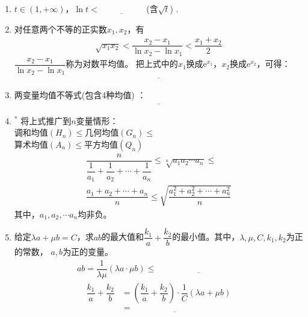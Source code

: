 \documentclass{article}
\newif\ifte
\newcommand{\e}{\mathrm{e}}
\renewcommand\leq\leqslant
\begin{document}
\begin{multicols}{2}
\begin{enumerate}[leftmargin=20pt]
\item $ t\in(1,+\infty) $，$ \ln t<\underline{\ \ifte 
    \sqrt{t}-\dfrac{1}{\sqrt{t}} \else \hspace{2cm} \fi\ } $
\ifte \else (含$ \sqrt{t} $) \fi.

\item 对任意两个不等的正实数$ x_1,x_2 $，有
\begin{align*}
    \sqrt{x_1x_2}<\dfrac{x_2-x_1}{\ln x_2-\ln x_1}<\dfrac{x_1+x_2}{2}
\end{align*}
$ \dfrac{x_2-x_1}{\ln x_2-\ln x_1} $称为对数平均值。
把上式中的$ x_1 $换成$ \e^{x_1} $，$ x_2 $换成$ \e^{x_2} $，可得：
\begin{align*}
    \underline{\ \ifte\e^{\frac{x_1+x_2}{2}}<\dfrac{\e^{x_2}
    -\e^{x_1}}{x_2-x_1}<\dfrac{\e^{x_1}+\e^{x_2}}{2}
    \else \hspace{7cm} \fi\ }
\end{align*}

\item 两变量均值不等式\ifte \else (包含4种均值) \fi：
\begin{align*}
    \underline{\ \ifte \dfrac{2}{\dfrac{1}{a}+\dfrac{1}{b}}\leq 
    \sqrt{ab} \leq \dfrac{a+b}{2}
    \leq \sqrt{\dfrac{a^2+b^2}{2}}\else \hspace{7cm} \fi\ }
\end{align*}

\item $^*$ 将上式推广到$ n $变量情形：\\
调和均值$(H_n) \leq $几何均值$(G_n) \leq $ \\
算术均值$(A_n) \leq $平方均值$ (Q_n) $
\begin{gather*}
    \dfrac{n}{\dfrac{1}{a_1}+\dfrac{1}{a_2}+\cdots +\dfrac{1}{a_n}}\leq 
    \sqrt[n]{a_1a_2\cdots a_n} \leq \\ \dfrac{a_1+a_2+\cdots +a_n}{n} \leq 
    \sqrt{\dfrac{a_1^2+a_2^2+\cdots +a_n^2}{n}}
\end{gather*}
其中，$ a_1,a_2,\cdots a_n $均非负。

\item 给定$ \lambda a+\mu b=C $，求$ ab $的最大值和$ \dfrac{k_1}{a}+
\dfrac{k_2}{b} $的最小值。其中，$ \lambda,\mu,C,k_1,k_2 $为正的常数，
$ a,b $为正的变量。
\begin{gather*}
    ab=\dfrac{1}{\lambda\mu}(\lambda a\cdot \mu b)\leq 
   \underline{\ \ifte \dfrac{1}{\lambda\mu}\left(\dfrac{\lambda a
   +\mu b}{2}\right)^2=\dfrac{C^2}{4\lambda\mu}\else \hspace{4cm} \fi\ } 
\end{gather*}
\begin{align*}
    \dfrac{k_1}{a}+\dfrac{k_2}{b} &=\left(\dfrac{k_1}{a}+
    \dfrac{k_2}{b}\right)\cdot
    \dfrac{1}{C}\left(\lambda a+\mu b\right)\\ &=\underline{\ \ifte 
    \dfrac{1}{C}\left(k_1\lambda +k_2\mu +k_1\mu \dfrac{b}{a}+k_2
    \lambda \dfrac{a}{b}\right)\else \hspace{4cm} \fi\ } 
\end{align*}


\end{enumerate}
\end{multicols}
\end{document}
